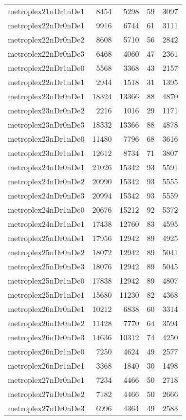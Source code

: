 \begin{tabular}{lrrrr}
metroplex21nDr1nDe1 & 8454 & 5298 & 59 & 3097 \\
metroplex22nDr0nDe1 & 9916 & 6744 & 61 & 3111 \\
metroplex22nDr0nDe2 & 8608 & 5710 & 56 & 2842 \\
metroplex22nDr0nDe3 & 6468 & 4060 & 47 & 2361 \\
metroplex22nDr1nDe0 & 5568 & 3368 & 43 & 2157 \\
metroplex22nDr1nDe1 & 2944 & 1518 & 31 & 1395 \\
metroplex23nDr0nDe1 & 18324 & 13366 & 88 & 4870 \\
metroplex23nDr0nDe2 & 2216 & 1016 & 29 & 1171 \\
metroplex23nDr0nDe3 & 18332 & 13366 & 88 & 4878 \\
metroplex23nDr1nDe0 & 11480 & 7796 & 68 & 3616 \\
metroplex23nDr1nDe1 & 12612 & 8734 & 71 & 3807 \\
metroplex24nDr0nDe1 & 21026 & 15342 & 93 & 5591 \\
metroplex24nDr0nDe2 & 20990 & 15342 & 93 & 5555 \\
metroplex24nDr0nDe3 & 20994 & 15342 & 93 & 5559 \\
metroplex24nDr1nDe0 & 20676 & 15212 & 92 & 5372 \\
metroplex24nDr1nDe1 & 17438 & 12760 & 83 & 4595 \\
metroplex25nDr0nDe1 & 17956 & 12942 & 89 & 4925 \\
metroplex25nDr0nDe2 & 18072 & 12942 & 89 & 5041 \\
metroplex25nDr0nDe3 & 18076 & 12942 & 89 & 5045 \\
metroplex25nDr1nDe0 & 17838 & 12942 & 89 & 4807 \\
metroplex25nDr1nDe1 & 15680 & 11230 & 82 & 4368 \\
metroplex26nDr0nDe1 & 10212 & 6838 & 60 & 3314 \\
metroplex26nDr0nDe2 & 11428 & 7770 & 64 & 3594 \\
metroplex26nDr0nDe3 & 14636 & 10312 & 74 & 4250 \\
metroplex26nDr1nDe0 & 7250 & 4624 & 49 & 2577 \\
metroplex26nDr1nDe1 & 3368 & 1840 & 30 & 1498 \\
metroplex27nDr0nDe1 & 7234 & 4466 & 50 & 2718 \\
metroplex27nDr0nDe2 & 7182 & 4466 & 50 & 2666 \\
metroplex27nDr0nDe3 & 6996 & 4364 & 49 & 2583 \\

\end{tabular}
